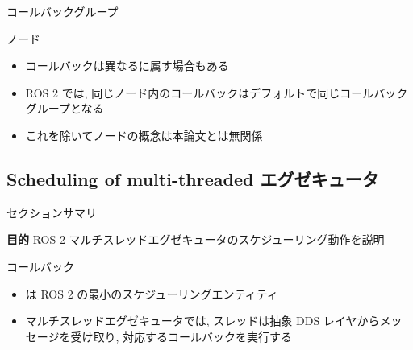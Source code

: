 \begin{frame}{コールバックグループ}

\end{frame}

\begin{frame}{ノード}
    \begin{itemize}
        \item コールバックは異なるに属す場合もある
        \item ROS 2 では, 同じノード内のコールバックはデフォルトで同じコールバックグループとなる
        \item これを除いてノードの概念は本論文とは無関係
    \end{itemize}

\end{frame}


\subsection{Scheduling of multi-threaded エグゼキュータ}
\label{ssec: scheduling_of_multi_threaded_エグゼキュータ}

\begin{frame}{セクションサマリ}
\begin{itembox}[l]{\textbf{目的}}
    ROS 2 マルチスレッドエグゼキュータのスケジューリング動作を説明
\end{itembox}
\end{frame}

\begin{frame}{コールバック}
    \begin{itemize}
        \item {}は ROS 2 の最小のスケジューリングエンティティ
        \item マルチスレッドエグゼキュータでは, スレッドは抽象 DDS レイヤからメッセージを受け取り, 対応するコールバックを実行する
    \end{itemize}
\end{frame}

